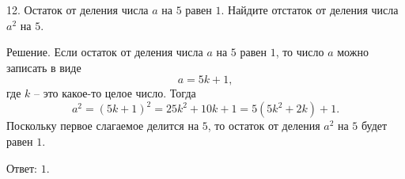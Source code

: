 12. Остаток от деления числа $a$ на $5$ равен $1$. Найдите отстаток от деления числа $a^2$ на $5$.

Решение. Если остаток от деления числа  $a$ на $5$ равен $1$, то число $a$ можно записать в виде $$a=5k+1,$$ где $k$ -- это какое-то целое число. Тогда $$a^2 = (5k+1)^2 = 25k^2+10k+1 = 5(5k^2+2k)+1.$$ Поскольку первое слагаемое делится на $5$, то остаток от деления $a^2$ на $5$ будет равен $1$.

Ответ: $1$.

